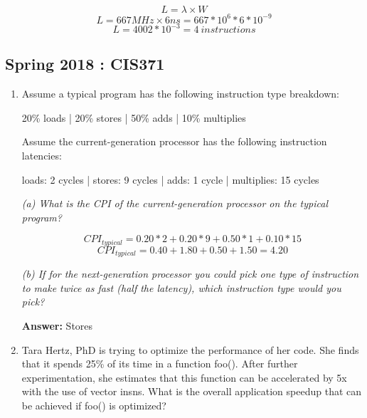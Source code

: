 \documentclass[12pt]{article}
\newenvironment{QandA}{\begin{enumerate}[label=\bfseries\arabic*.]\bfseries}
                      {\end{enumerate}}
\newenvironment{answered}{\par\quad\normalfont}{}
\begin{document}
\begin{QandA}
    \begin{equation*}
        L = \lambda \times W
    \end{equation*}
    \begin{equation*}
        L = 667 MHz \times 6ns = 667 * 10^{6} * 6 * 10^{-9}
    \end{equation*}
    \begin{equation*}
        L = 4002 * 10^{-3} = 4\ instructions
    \end{equation*}
\end{QandA}

\subsection{Spring 2018 : CIS371}

\begin{QandA}
   \item Assume a typical program has the following instruction type breakdown:
   
    20\% loads | 20\% stores | 50\% adds | 10\% multiplies

    Assume the current-generation processor has the following instruction latencies:
    
    loads: 2 cycles | stores: 9 cycles | adds: 1 cycle | multiplies: 15 cycles

    \begin{answered}
    
    \textit{(a) What is the CPI of the current-generation processor on the typical program?}
    
    \begin{equation*}
        CPI_{typical} = 0.20 * 2 + 0.20 * 9 + 0.50 * 1 + 0.10 * 15
    \end{equation*}
    \begin{equation*}
        CPI_{typical} = 0.40 + 1.80 + 0.50 + 1.50 = 4.20
    \end{equation*}
    
    \textit{(b) If for the next-generation processor you could pick one type of instruction to make twice as fast (half the latency), which instruction type would you pick?}
    
    \textbf{Answer:} Stores
    \end{answered}
    
    \item Tara Hertz, PhD is trying to optimize the performance of her code. She finds that it spends 25\% of its time in a function foo(). After further experimentation, she estimates that this function can be accelerated by 5x with the use of vector insns. What is the overall application speedup that can be achieved if foo() is optimized?
    

\end{QandA}
\end{document}
